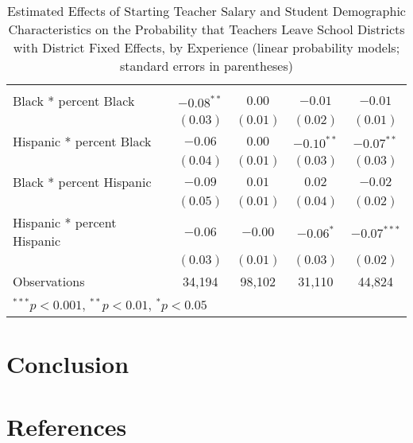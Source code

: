 \documentclass[]{article}
\begin{document}
\begin{table}
\begin{center}
\begin{tabular}{l c c c c }
                                            &              &              &              &               \\
\quad Black * percent Black                 & $-0.08^{**}$ & $0.00$       & $-0.01$      & $-0.01$       \\
                                            & $(0.03)$     & $(0.01)$     & $(0.02)$     & $(0.01)$      \\
\quad Hispanic * percent Black              & $-0.06$      & $0.00$       & $-0.10^{**}$ & $-0.07^{**}$  \\
                                            & $(0.04)$     & $(0.01)$     & $(0.03)$     & $(0.03)$      \\
\quad Black * percent Hispanic              & $-0.09$      & $0.01$       & $0.02$       & $-0.02$       \\
                                            & $(0.05)$     & $(0.01)$     & $(0.04)$     & $(0.02)$      \\
\quad Hispanic * percent Hispanic           & $-0.06$      & $-0.00$      & $-0.06^{*}$  & $-0.07^{***}$ \\
                                            & $(0.03)$     & $(0.01)$     & $(0.03)$     & $(0.02)$      \\
\hline
Observations                                & 34,194        & 98,102        & 31,110        & 44,824         \\
\hline
\multicolumn{5}{l}{\scriptsize{$^{***}p<0.001$, $^{**}p<0.01$, $^*p<0.05$}}
\end{tabular}
\caption{Estimated Effects of Starting Teacher Salary and Student Demographic Characteristics on the Probability that Teachers Leave School Districts with District Fixed Effects, by Experience (linear probability models; standard errors in parentheses)}
\label{tbl:reg_lpm_fe}
\end{center}
\end{table}

\section{Conclusion}\label{conclusion}

\section{References}\label{references}
\end{document}
